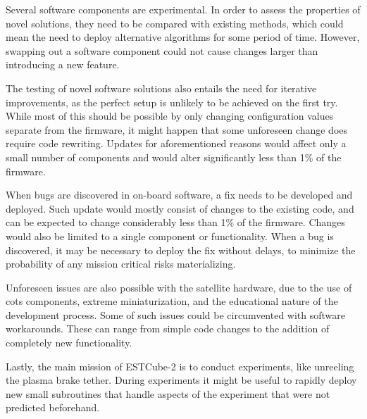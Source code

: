 Several software components are experimental. In order to assess the properties of novel solutions, they need to be compared with existing methods, which could mean the need to deploy alternative algorithms for some period of time. However, swapping out a software component could not cause changes larger than introducing a new feature.

The testing of novel software solutions also entails the need for iterative improvements, as the perfect setup is unlikely to be achieved on the first try. While most of this should be possible by only changing configuration values separate from the firmware, it might happen that some unforeseen change does require code rewriting. Updates for aforementioned reasons would affect only a small number of components and would alter significantly less than 1\% of the firmware.

When bugs are discovered in on-board software, a fix needs to be developed and deployed. Such update would mostly consist of changes to the existing code, and can be expected to change considerably less than 1\% of the firmware. Changes would also be limited to a single component or functionality. When a bug is discovered, it may be necessary to deploy the fix without delays, to minimize the probability of any mission critical risks materializing.

Unforeseen issues are also possible with the satellite hardware, due to the use of \gls{cots} components, extreme miniaturization, and the educational nature of the development process. Some of such issues could be circumvented with software workarounds. These can range from simple code changes to the addition of completely new functionality.

Lastly, the main mission of ESTCube-2 is to conduct experiments, like unreeling the plasma brake tether. During experiments it might be useful to rapidly deploy new small subroutines that handle aspects of the experiment that were not predicted beforehand.
